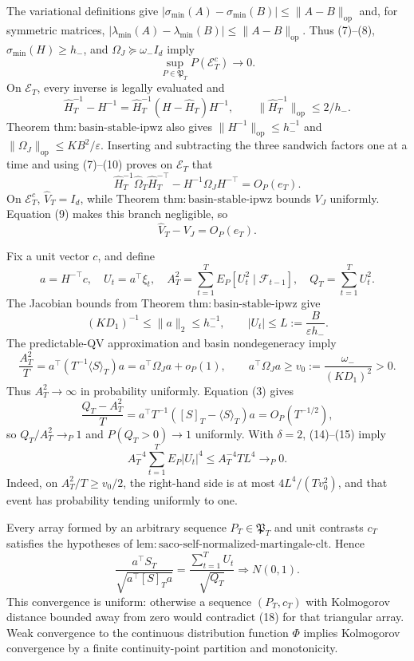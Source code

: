 The variational definitions give \(|\sigma_{\min}(A)-\sigma_{\min}(B)|\le\|A-B\|_{\mathrm{op}}\) and, for symmetric matrices, \(|\lambda_{\min}(A)-\lambda_{\min}(B)|\le\|A-B\|_{\mathrm{op}}\). Thus (7)--(8), \(\sigma_{\min}(H)\ge h_-\), and \(\Omega_J\succeq\omega_-I_d\) imply
\[
 \sup_{P\in\mathfrak P_T}P(\mathcal E_T^c)\longrightarrow0.
\tag{9}
\]
On \(\mathcal E_T\), every inverse is legally evaluated and
\[
 \widehat H_T^{-1}-H^{-1}
 =\widehat H_T^{-1}(H-\widehat H_T)H^{-1},
 \qquad \|\widehat H_T^{-1}\|_{\mathrm{op}}\le2/h_-.
\tag{10}
\]
Theorem \(\mathrm{thm:basin\text{-}stable\text{-}ipwz}\) also gives \(\|H^{-1}\|_{\mathrm{op}}\le h_-^{-1}\) and \(\|\Omega_J\|_{\mathrm{op}}\le KB^2/\varepsilon\). Inserting and subtracting the three sandwich factors one at a time and using (7)--(10) proves on \(\mathcal E_T\) that
\[
 \widehat H_T^{-1}\widehat\Omega_T\widehat H_T^{-\top}
 -H^{-1}\Omega_JH^{-\top}=O_P(e_T).
\tag{11}
\]
On \(\mathcal E_T^c\), \(\widehat V_T=I_d\), while Theorem \(\mathrm{thm:basin\text{-}stable\text{-}ipwz}\) bounds \(V_J\) uniformly. Equation (9) makes this branch negligible, so
\[
 \widehat V_T-V_J=O_P(e_T).
\tag{12}
\]

Fix a unit vector \(c\), and define
\[
 a=H^{-\top}c,\quad U_t=a^\top\xi_t,\quad
 A_T^2=\sum_{t=1}^TE_P[U_t^2\mid\mathcal F_{t-1}],\quad
 Q_T=\sum_{t=1}^TU_t^2.
\tag{13}
\]
The Jacobian bounds from Theorem \(\mathrm{thm:basin\text{-}stable\text{-}ipwz}\) give
\[
 (KD_1)^{-1}\le\|a\|_2\le h_-^{-1},
 \qquad |U_t|\le L:=\frac{B}{\varepsilon h_-}.
\tag{14}
\]
The predictable-QV approximation and basin nondegeneracy imply
\[
 \frac{A_T^2}{T}
 =a^\top(T^{-1}\langle S\rangle_T)a
 =a^\top\Omega_Ja+o_P(1),
 \qquad a^\top\Omega_Ja\ge v_0:=\frac{\omega_-}{(KD_1)^2}>0.
\tag{15}
\]
Thus \(A_T^2\to\infty\) in probability uniformly. Equation (3) gives
\[
 \frac{Q_T-A_T^2}{T}
 =a^\top T^{-1}([S]_T-\langle S\rangle_T)a
 =O_P(T^{-1/2}),
\tag{16}
\]
so \(Q_T/A_T^2\to_P1\) and \(P(Q_T>0)\to1\) uniformly. With \(\delta=2\), (14)--(15) imply
\[
 A_T^{-4}\sum_{t=1}^TE_P|U_t|^4
 \le A_T^{-4}TL^4\longrightarrow_P0.
\tag{17}
\]
Indeed, on \(A_T^2/T\ge v_0/2\), the right-hand side is at most \(4L^4/(Tv_0^2)\), and that event has probability tending uniformly to one.

Every array formed by an arbitrary sequence \(P_T\in\mathfrak P_T\) and unit contrasts \(c_T\) satisfies the hypotheses of \(\mathrm{lem:saco\text{-}self\text{-}normalized\text{-}martingale\text{-}clt}\). Hence
\[
 \frac{a^\top S_T}{\sqrt{a^\top[S]_Ta}}
 =\frac{\sum_{t=1}^TU_t}{\sqrt{Q_T}}\Rightarrow N(0,1).
\tag{18}
\]
This convergence is uniform: otherwise a sequence \((P_T,c_T)\) with Kolmogorov distance bounded away from zero would contradict (18) for that triangular array. Weak convergence to the continuous distribution function \(\Phi\) implies Kolmogorov convergence by a finite continuity-point partition and monotonicity.

